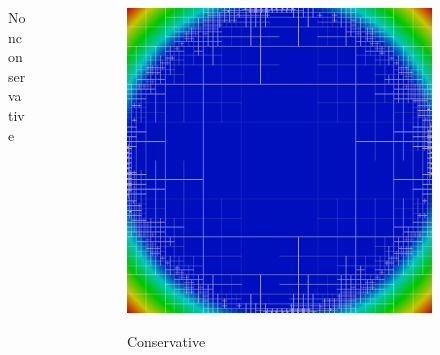 \documentclass{beamer}
\begin{document}
\begin{frame}
{\begin{columns}
\begin{column}{0.49\textwidth}
\begin{figure}
Nonconservative
\end{figure}
\end{column}
\begin{column}{0.49\textwidth}
\begin{figure}
\centering
\includegraphics[width=1.0\textwidth]{Vortex/modified6c.png}

Conservative
\end{figure}
\end{column}
\end{columns}
}
\end{frame}

\end{document}
